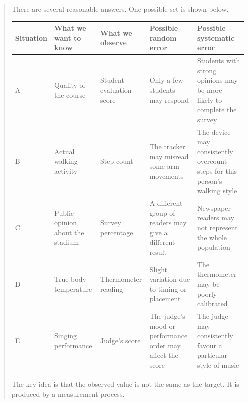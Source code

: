 \documentclass[
  letterpaper,
  DIV=11,
  numbers=noendperiod]{scrreprt}
\newcounter{none} %
\begin{document}
\begin{tcolorbox}
\begin{quote}
There are several reasonable answers. One possible set is shown below.

{\def\LTcaptype{none} %
\begin{longtable}[]{@{}
  >{\raggedright\arraybackslash}p{}
  >{\raggedright\arraybackslash}p{}
  >{\raggedright\arraybackslash}p{}
  >{\raggedright\arraybackslash}p{}
  >{\raggedright\arraybackslash}p{}@{}}
\toprule\noalign{}
\begin{minipage}[b]{\linewidth}\raggedright
Situation
\end{minipage} & \begin{minipage}[b]{\linewidth}\raggedright
What we want to know
\end{minipage} & \begin{minipage}[b]{\linewidth}\raggedright
What we observe
\end{minipage} & \begin{minipage}[b]{\linewidth}\raggedright
Possible random error
\end{minipage} & \begin{minipage}[b]{\linewidth}\raggedright
Possible systematic error
\end{minipage} \\
\midrule\noalign{}
\endhead
\bottomrule\noalign{}
\endlastfoot
A & Quality of the course & Student evaluation score & Only a few
students may respond & Students with strong opinions may be more likely
to complete the survey \\
B & Actual walking activity & Step count & The tracker may misread some
arm movements & The device may consistently overcount steps for this
person's walking style \\
C & Public opinion about the stadium & Survey percentage & A different
group of readers may give a different result & Newspaper readers may not
represent the whole population \\
D & True body temperature & Thermometer reading & Slight variation due
to timing or placement & The thermometer may be poorly calibrated \\
E & Singing performance & Judge's score & The judge's mood or
performance order may affect the score & The judge may consistently
favour a particular style of music \\
\end{longtable}
}

The key idea is that the observed value is not the same as the target.
It is produced by a measurement process.
\end{quote}

\end{tcolorbox}
\end{document}
